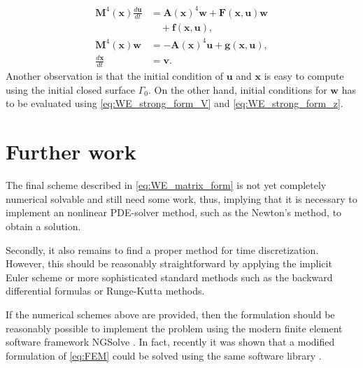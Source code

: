 \begin{subequations}
\label{eq:WE_matrix_form}
\begin{align}
    \mathbf{M}^{4}( \mathbf{x}) \frac{d \mathbf{u}}{dt}    & = \mathbf{A}( \mathbf{x}) ^{4} \mathbf{w} +  \mathbf{F}( \mathbf{x}, \mathbf{u}) \mathbf{w} \nonumber  \\ & \quad  + \mathbf{f}( \mathbf{x}, \mathbf{u}),     \\
   \mathbf{M}^{4}( \mathbf{x}) \mathbf{w}  & =- \mathbf{A}( \mathbf{x}) ^{4} \mathbf{u}+  \mathbf{g}( \mathbf{x}, \mathbf{u}), \\
   \frac{d\mathbf{x}}{dt}  & = \mathbf{v}.
\end{align}
\end{subequations}
Another observation is that the initial condition of $\mathbf{u}$ and $\mathbf{x}$  is easy to compute using the initial closed surface $\Gamma _{0}$. On the other hand, initial conditions for $\mathbf{w}$ has to be evaluated using \eqref{eq:WE_strong_form_V} and \eqref{eq:WE_strong_form_z}.



\section{Further work}
The final scheme described in \eqref{eq:WE_matrix_form} is not yet completely numerical solvable and still need some work, thus, implying that it is necessary to implement an nonlinear PDE-solver method, such as the Newton's method, to obtain a solution.

Secondly, it also remains to find a proper method for time discretization. However, this should be reasonably straightforward by applying the implicit Euler scheme or more sophisticated standard methods such as the backward differential formulas or Runge-Kutta methods.

If the numerical schemes above are provided, then the formulation should be reasonably possible to implement the problem using the modern finite element software framework NGSolve \cite{schoberl2017netgen}. In fact, recently it was shown that a modified formulation of \eqref{eq:FEM} could be solved using the same software library \cite{hu2022evolving}.
